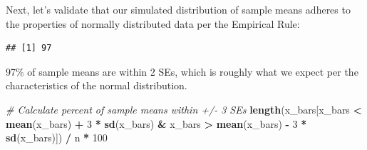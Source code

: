 \documentclass[]{book}
\newenvironment{Shaded}{\begin{snugshade}}{\end{snugshade}}
\newcommand{\CommentTok}[1]{\textcolor[rgb]{0.56,0.35,0.01}{\textit{#1}}}
\newcommand{\DecValTok}[1]{\textcolor[rgb]{0.00,0.00,0.81}{#1}}
\newcommand{\KeywordTok}[1]{\textcolor[rgb]{0.13,0.29,0.53}{\textbf{#1}}}
\newcommand{\NormalTok}[1]{#1}
\newcommand{\OperatorTok}[1]{\textcolor[rgb]{0.81,0.36,0.00}{\textbf{#1}}}
\newcommand{\StringTok}[1]{\textcolor[rgb]{0.31,0.60,0.02}{#1}}
\begin{document}
Next, let's validate that our simulated distribution of sample means adheres to the properties of normally distributed data per the Empirical Rule:

\begin{Shaded}
\end{Shaded}

\begin{verbatim}
## [1] 97
\end{verbatim}

97\% of sample means are within 2 SEs, which is roughly what we expect per the characteristics of the normal distribution.

\begin{Shaded}
\begin{Highlighting}[]
\CommentTok{# Calculate percent of sample means within +/- 3 SEs}
\KeywordTok{length}\NormalTok{(x_bars[x_bars }\OperatorTok{<}\StringTok{ }\KeywordTok{mean}\NormalTok{(x_bars) }\OperatorTok{+}\StringTok{ }\DecValTok{3} \OperatorTok{*}\StringTok{ }\KeywordTok{sd}\NormalTok{(x_bars) }\OperatorTok{&}\StringTok{ }\NormalTok{x_bars }\OperatorTok{>}\StringTok{ }\KeywordTok{mean}\NormalTok{(x_bars) }\OperatorTok{-}\StringTok{ }\DecValTok{3} \OperatorTok{*}\StringTok{ }\KeywordTok{sd}\NormalTok{(x_bars)]) }\OperatorTok{/}\StringTok{ }\NormalTok{n }\OperatorTok{*}\StringTok{ }\DecValTok{100}
\end{Highlighting}
\end{Shaded}
\end{document}
